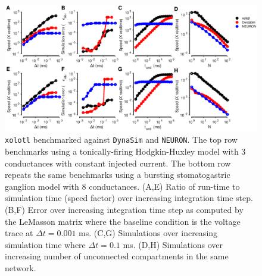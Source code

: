 \documentclass{frontiersSCNS} %
\begin{document}
\begin{figure}
	\centering
	\includegraphics[width=1.0\linewidth]{gfx/figure_benchmark}
	\caption{\texttt{xolotl} benchmarked against \texttt{DynaSim} and \texttt{NEURON}. The top row benchmarks using a tonically-firing Hodgkin-Huxley model with 3 conductances with constant injected current. The bottom row repeats the same benchmarks using a bursting stomatogastric ganglion model with 8 conductances. (A,E) Ratio of run-time to simulation time (speed factor) over increasing integration time step. (B,F) Error over increasing integration time step as computed by the LeMasson matrix where the baseline condition is the voltage trace at $\Delta t = 0.001$ ms. (C,G) Simulations over increasing simulation time where $\Delta t = 0.1$ ms. (D,H) Simulations over increasing number of unconnected compartments in the same network.}
	\label{fig:figurebenchmark}
\end{figure}
\end{document}
